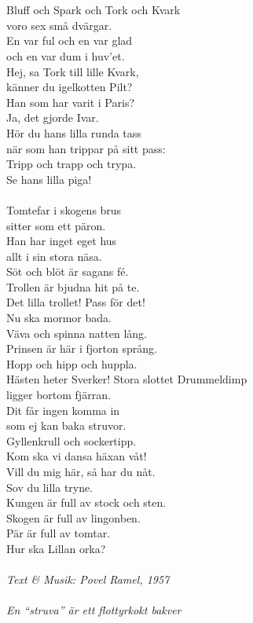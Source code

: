 \\
\vspace{10pt}\\
Bluff och Spark och Tork och Kvark\\
voro sex små dvärgar.\\
En var ful och en var glad \\
och en var dum i huv'et.\\
Hej, sa Tork till lille Kvark,\\
känner du igelkotten Pilt?\\
Han som har varit i Paris?\\
Ja, det gjorde Ivar.\\
Hör du hans lilla runda tass\\
när som han trippar på sitt pass:\\
Tripp och trapp och trypa.\\
Se hans lilla piga!\\
\\
Tomtefar i skogens brus\\
sitter som ett päron.\\
Han har inget eget hus \\
allt i sin stora näsa.\\
Söt och blöt är sagans fé.\\
Trollen är bjudna hit på te.\\
Det lilla trollet! Pass för det!\\
Nu ska mormor bada.\\
Väva och spinna natten lång.\\
Prinsen är här i fjorton språng.\\
Hopp och hipp och huppla.\\
Hästen heter Sverker!
\newpage
Stora slottet Drummeldimp\\
ligger bortom fjärran.\\
Dit får ingen komma in\\
som ej kan baka struvor.\\
Gyllenkrull och sockertipp.\\
Kom ska vi dansa häxan våt!\\
Vill du mig här, så har du nåt.\\
Sov du lilla tryne.\\
Kungen är full av stock och sten.\\
Skogen är full av lingonben.\\
Pär är full av tomtar.\\
Hur ska Lillan orka?\\
\\
{\footnotesize\textit{Text & Musik: Povel Ramel, 1957\\ \\ En
    ``struva'' är ett flottyrkokt bakver}}
